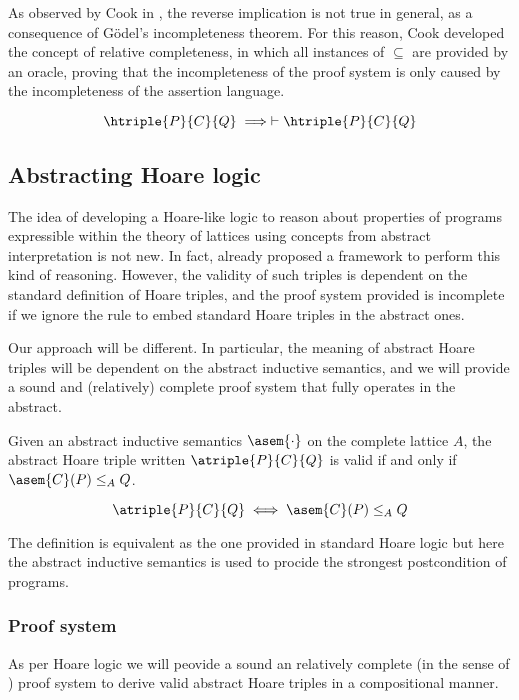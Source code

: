 As observed by Cook in \cite{Cook78}, the reverse implication is not true in 
general, as a consequence of Gödel's incompleteness theorem. For this reason, 
Cook developed the concept of relative completeness, in which all instances of 
$\subseteq$ are provided by an oracle, proving that the incompleteness of the 
proof system is only caused by the incompleteness of the assertion language.

\begin{theorem}
  $$\htriple{P}{C}{Q} \implies \vdash \htriple{P}{C}{Q}$$
\end{theorem}

\subsection{Abstracting Hoare logic}
The idea of developing a Hoare-like logic to reason about properties of 
programs expressible within the theory of lattices using concepts from abstract 
interpretation is not new. In fact, \cite{Cousot12} already proposed a framework 
to perform this kind of reasoning. However, the validity of such triples is 
dependent on the standard definition of Hoare triples, and the proof system 
provided is incomplete if we ignore the rule to embed standard Hoare triples 
in the abstract ones.

Our approach will be different. In particular, the meaning of abstract Hoare 
triples will be dependent on the abstract inductive semantics, and we will 
provide a sound and (relatively) complete proof system that fully operates in 
the abstract.

\begin{definition}
  \label{def:aht}
  Given an abstract inductive semantics $\asem{\cdot}$ on the complete lattice
  $A$, the abstract Hoare triple written $\atriple{P}{C}{Q}$ is valid if
  and only if $\asem{C}(P) \leq_A Q$.

  $$\atriple{P}{C}{Q} \iff \asem{C}(P) \leq_A Q$$
\end{definition}

The definition is equivalent as the one provided in standard Hoare logic but
here the abstract inductive semantics is used to procide the strongest 
postcondition of programs.

\subsubsection{Proof system}
As per Hoare logic we will peovide a sound an relatively complete (in the sense
of \cite{Cook78}) proof system to derive valid abstract Hoare triples in a 
compositional manner.


